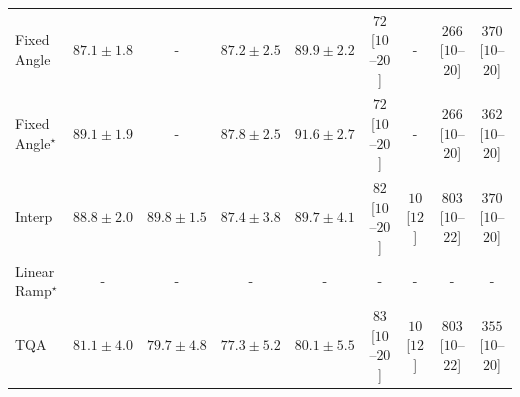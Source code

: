 \begin{tabular}{l|cccc|cccc|}
Fixed Angle & {\cellcolor[HTML]{05659F}} \color[HTML]{F1F1F1} $87.1\pm 1.8$ & {\cellcolor[HTML]{000000}} \color[HTML]{F1F1F1} {\cellcolor{white}} \color{black} - & {\cellcolor[HTML]{04649E}} \color[HTML]{F1F1F1} $87.2\pm 2.5$ & {\cellcolor[HTML]{034B76}} \color[HTML]{F1F1F1} $89.9\pm 2.2$ & {\cellcolor[HTML]{FEE9E5}} \color[HTML]{000000} $72$ [$10$--$20$] & {\cellcolor[HTML]{000000}} \color[HTML]{F1F1F1} {\cellcolor{white}} \color{black} - & {\cellcolor[HTML]{FBAFBA}} \color[HTML]{000000} $266$ [$10$--$20$] & {\cellcolor[HTML]{F87CA8}} \color[HTML]{F1F1F1} $370$ [$10$--$20$] \\
Fixed Angle$^\star$ & {\cellcolor[HTML]{045585}} \color[HTML]{F1F1F1} $89.1\pm 1.9$ & {\cellcolor[HTML]{000000}} \color[HTML]{F1F1F1} {\cellcolor{white}} \color{black} - & {\cellcolor[HTML]{046097}} \color[HTML]{F1F1F1} $87.8\pm 2.5$ & {\cellcolor[HTML]{023858}} \color[HTML]{F1F1F1} $91.6\pm 2.7$ & {\cellcolor[HTML]{FEE9E5}} \color[HTML]{000000} $72$ [$10$--$20$] & {\cellcolor[HTML]{000000}} \color[HTML]{F1F1F1} {\cellcolor{white}} \color{black} - & {\cellcolor[HTML]{FBAFBA}} \color[HTML]{000000} $266$ [$10$--$20$] & {\cellcolor[HTML]{F881AA}} \color[HTML]{F1F1F1} $362$ [$10$--$20$] \\
Interp & {\cellcolor[HTML]{04588A}} \color[HTML]{F1F1F1} $88.8\pm 2.0$ & {\cellcolor[HTML]{034C78}} \color[HTML]{F1F1F1} $89.8\pm 1.5$ & {\cellcolor[HTML]{04639B}} \color[HTML]{F1F1F1} $87.4\pm 3.8$ & {\cellcolor[HTML]{034D79}} \color[HTML]{F1F1F1} $89.7\pm 4.1$ & {\cellcolor[HTML]{FEE6E3}} \color[HTML]{000000} $82$ [$10$--$20$] & {\cellcolor[HTML]{FFF7F3}} \color[HTML]{000000} $10$ [$12$] & {\cellcolor[HTML]{49006A}} \color[HTML]{F1F1F1} $803$ [$10$--$22$] & {\cellcolor[HTML]{F87CA8}} \color[HTML]{F1F1F1} $370$ [$10$--$20$] \\
Linear Ramp$^\star$ & {\cellcolor[HTML]{000000}} \color[HTML]{F1F1F1} {\cellcolor{white}} \color{black} - & {\cellcolor[HTML]{000000}} \color[HTML]{F1F1F1} {\cellcolor{white}} \color{black} - & {\cellcolor[HTML]{000000}} \color[HTML]{F1F1F1} {\cellcolor{white}} \color{black} - & {\cellcolor[HTML]{000000}} \color[HTML]{F1F1F1} {\cellcolor{white}} \color{black} - & {\cellcolor[HTML]{000000}} \color[HTML]{F1F1F1} {\cellcolor{white}} \color{black} - & {\cellcolor[HTML]{000000}} \color[HTML]{F1F1F1} {\cellcolor{white}} \color{black} - & {\cellcolor[HTML]{000000}} \color[HTML]{F1F1F1} {\cellcolor{white}} \color{black} - & {\cellcolor[HTML]{000000}} \color[HTML]{F1F1F1} {\cellcolor{white}} \color{black} - \\
TQA & {\cellcolor[HTML]{589EC8}} \color[HTML]{F1F1F1} $81.1\pm 4.0$ & {\cellcolor[HTML]{76AAD0}} \color[HTML]{F1F1F1} $79.7\pm 4.8$ & {\cellcolor[HTML]{9FBAD9}} \color[HTML]{000000} $77.3\pm 5.2$ & {\cellcolor[HTML]{6DA6CD}} \color[HTML]{F1F1F1} $80.1\pm 5.5$ & {\cellcolor[HTML]{FEE6E3}} \color[HTML]{000000} $83$ [$10$--$20$] & {\cellcolor[HTML]{FFF7F3}} \color[HTML]{000000} $10$ [$12$] & {\cellcolor[HTML]{49006A}} \color[HTML]{F1F1F1} $803$ [$10$--$22$] & {\cellcolor[HTML]{F984AB}} \color[HTML]{F1F1F1} $355$ [$10$--$20$] \\

\end{tabular}
